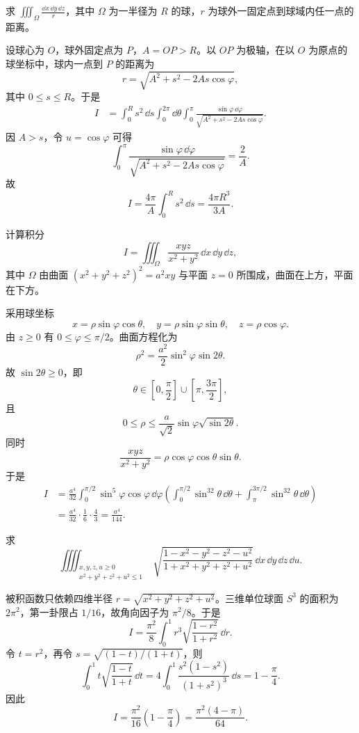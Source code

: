 \begin{xexercise}[5]
求 $\displaystyle\iiint_\Omega\frac{\dd x\,\dd y\,\dd z}{r}$，其中 $\Omega$ 为一半径为 $R$ 的球，$r$ 为球外一固定点到球域内任一点的距离。
\end{xexercise}
\begin{xsolution}
设球心为 $O$，球外固定点为 $P$，$A=OP>R$。以 $OP$ 为极轴，在以 $O$ 为原点的球坐标中，球内一点到 $P$ 的距离为
\[
 r=\sqrt{A^2+s^2-2As\cos\varphi},
\]
其中 $0\le s\le R$。于是
\begin{align*}
 I&=\int_0^R s^2\,\dd s\int_0^{2\pi}\dd\theta
 \int_0^\pi\frac{\sin\varphi\,\dd\varphi}
 {\sqrt{A^2+s^2-2As\cos\varphi}}.
\end{align*}
因 $A>s$，令 $u=\cos\varphi$ 可得
\[
 \int_0^\pi\frac{\sin\varphi\,\dd\varphi}
 {\sqrt{A^2+s^2-2As\cos\varphi}}=\frac2A.
\]
故
\[
 I=\frac{4\pi}{A}\int_0^Rs^2\,\dd s
 =\boxed{\frac{4\pi R^3}{3A}}.
\]
\end{xsolution}


\begin{xexercise}[6]
计算积分
  \[
    I=\iiint_\Omega\frac{xyz}{x^2+y^2}\,\dd x\,\dd y\,\dd z,
  \]
  其中 $\Omega$ 由曲面 $(x^2+y^2+z^2)^2=a^2xy$ 与平面 $z=0$ 所围成，曲面在上方，平面在下方。
\end{xexercise}
\begin{xsolution}
采用球坐标
\[
 x=\rho\sin\varphi\cos\theta,
 \quad y=\rho\sin\varphi\sin\theta,
 \quad z=\rho\cos\varphi.
\]
由 $z\ge0$ 有 $0\le\varphi\le\pi/2$。曲面方程化为
\[
 \rho^2=\frac{a^2}{2}\sin^2\varphi\sin2\theta.
\]
故 $\sin2\theta\ge0$，即
\[
 \theta\in\left[0,\frac\pi2\right]\cup
 \left[\pi,\frac{3\pi}{2}\right],
\]
且
\[
 0\le\rho\le\frac a{\sqrt2}\sin\varphi\sqrt{\sin2\theta}.
\]
同时
\[
 \frac{xyz}{x^2+y^2}=\rho\cos\varphi\cos\theta\sin\theta.
\]
于是
\begin{align*}
 I&=\frac{a^4}{32}
 \int_0^{\pi/2}\sin^5\varphi\cos\varphi\,\dd\varphi
 \left(
 \int_0^{\pi/2}\sin^32\theta\,\dd\theta+
 \int_\pi^{3\pi/2}\sin^32\theta\,\dd\theta
 \right)\\
 &=\frac{a^4}{32}\cdot\frac16\cdot\frac43
 =\boxed{\frac{a^4}{144}}.
\end{align*}
\end{xsolution}


\begin{xexercise}[7]
求
  \[
    \iiiint_{\substack{x,y,z,u\ge0\\x^2+y^2+z^2+u^2\le1}}
    \sqrt{\frac{1-x^2-y^2-z^2-u^2}{1+x^2+y^2+z^2+u^2}}\,\dd x\,\dd y\,\dd z\,\dd u.
  \]
\end{xexercise}
\begin{xsolution}
被积函数只依赖四维半径 $r=\sqrt{x^2+y^2+z^2+u^2}$。三维单位球面 $S^3$ 的面积为 $2\pi^2$，第一卦限占 $1/16$，故角向因子为 $\pi^2/8$。于是
\[
 I=\frac{\pi^2}{8}\int_0^1r^3
 \sqrt{\frac{1-r^2}{1+r^2}}\,\dd r.
\]
令 $t=r^2$，再令 $s=\sqrt{(1-t)/(1+t)}$，则
\[
 \int_0^1t\sqrt{\frac{1-t}{1+t}}\,\dd t
 =4\int_0^1\frac{s^2(1-s^2)}{(1+s^2)^3}\,\dd s
 =1-\frac\pi4.
\]
因此
\[
 \boxed{I=\frac{\pi^2}{16}\left(1-\frac\pi4\right)
 =\frac{\pi^2(4-\pi)}{64}}.
\]
\end{xsolution}


